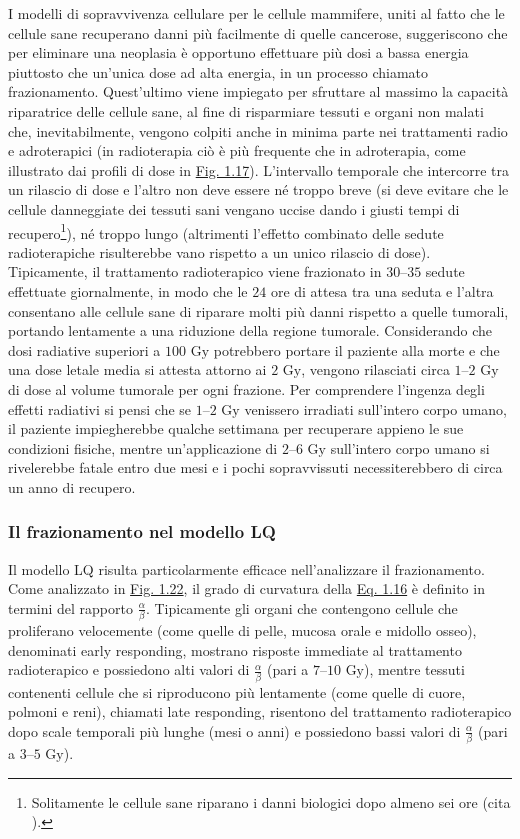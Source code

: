 \documentclass[12pt,a4paper,twoside]{report}
\begin{document}
	I modelli di sopravvivenza cellulare per le cellule mammifere, uniti al fatto che le cellule sane recuperano danni più facilmente di quelle cancerose, suggeriscono che per eliminare una neoplasia è opportuno effettuare più dosi a bassa energia piuttosto che un'unica dose ad alta energia, in un processo chiamato frazionamento. Quest'ultimo viene impiegato per sfruttare al massimo la capacità riparatrice delle cellule sane, al fine di risparmiare tessuti e organi non malati che, inevitabilmente, vengono colpiti anche in minima parte nei trattamenti radio e adroterapici (in radioterapia ciò è più frequente che in adroterapia, come illustrato dai profili di dose in \hyperref[fig:photon]{Fig. 1.17}). L'intervallo temporale che intercorre tra un rilascio di dose e l'altro non deve essere né troppo breve (si deve evitare che le cellule danneggiate dei tessuti sani vengano uccise dando i giusti tempi di recupero\footnote{Solitamente le cellule sane riparano i danni biologici dopo almeno sei ore (cita
		).}), né troppo lungo (altrimenti l'effetto combinato delle sedute radioterapiche risulterebbe vano rispetto a un unico rilascio di dose). Tipicamente, il trattamento radioterapico viene frazionato in $30$--$35$ sedute effettuate giornalmente, in modo che le $24$ ore di attesa tra una seduta e l'altra consentano alle cellule sane di riparare molti più danni rispetto a quelle tumorali, portando lentamente a una riduzione della regione tumorale. Considerando che dosi radiative superiori a $100 \mbox{ Gy}$ potrebbero portare il paziente alla morte e che una dose letale media si attesta attorno ai $2 \mbox{ Gy}$, vengono rilasciati circa $1$--$2\mbox{ Gy}$ di dose al volume tumorale per ogni frazione. Per comprendere l'ingenza degli effetti radiativi si pensi che se $1$--$2\mbox{ Gy}$ venissero irradiati sull'intero corpo umano, il paziente impiegherebbe qualche settimana per recuperare appieno le sue condizioni fisiche, mentre un'applicazione di $2$--$6\mbox{ Gy}$ sull'intero corpo umano si rivelerebbe fatale entro due mesi e i pochi sopravvissuti necessiterebbero di circa un anno di recupero.
		
	\subsubsection{Il frazionamento nel modello LQ}
	Il modello LQ risulta particolarmente efficace nell'analizzare il frazionamento. Come analizzato in \hyperref[fig:survival_cell]{Fig. 1.22}, il grado di curvatura della \hyperref[eq:survival2]{Eq. 1.16} è definito in termini del rapporto $\frac{\alpha}{\beta}$. Tipicamente gli organi che contengono cellule che proliferano velocemente (come quelle di pelle, mucosa orale e midollo osseo), denominati early responding, mostrano risposte immediate al trattamento radioterapico e possiedono alti valori di $\frac{\alpha}{\beta}$ (pari a $7$--$10\mbox{ Gy}$), mentre tessuti contenenti cellule che si riproducono più lentamente (come quelle di cuore, polmoni e reni), chiamati late responding, risentono del trattamento radioterapico dopo scale temporali più lunghe (mesi o anni) e possiedono bassi valori di $\frac{\alpha}{\beta}$ (pari a $3$--$5\mbox{ Gy}$).
	
\end{document}
